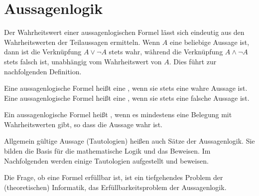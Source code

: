 \section{Aussagenlogik}
\label{sec:ElemLogik-Aussagenlogik}

\begin{Unit}
Der Wahrheitswert einer aussagenlogischen Formel lässt sich eindeutig aus den
Wahrheitswerten der Teilaussagen ermitteln. Wenn $A$ eine beliebige Aussage 
ist, dann ist die Verknüpfung $A \lor \neg A$ stets wahr, während die 
Verknüpfung $A \land \neg A$ stets falsch ist, unabhängig vom Wahrheitswert 
von $A$. Dies führt zur nachfolgenden Definition.

\begin{Definition}
Eine aussagenlogische Formel heißt eine , wenn sie stets 
eine wahre Aussage ist. Eine aussagenlogische Formel heißt eine
, wenn sie stets eine falsche Aussage ist.

Ein aussagenlogische Formel heißt , wenn es mindestens 
eine Belegung mit Wahrheitswerten gibt, so dass die Aussage wahr ist. 
\end{Definition}

Allgemein gültige Aussage (Tautologien) heißen auch Sätze der Aussagenlogik. 
Sie bilden die Basis für die mathematische Logik und das Beweisen. Im 
Nachfolgenden werden einige Tautologien aufgestellt und beweisen.

Die Frage, ob eine Formel erfüllbar ist, ist ein tiefgehendes Problem der
(theoretischen) Informatik, das Erfüllbarkeitsproblem der Aussagenlogik.
\end{Unit}

